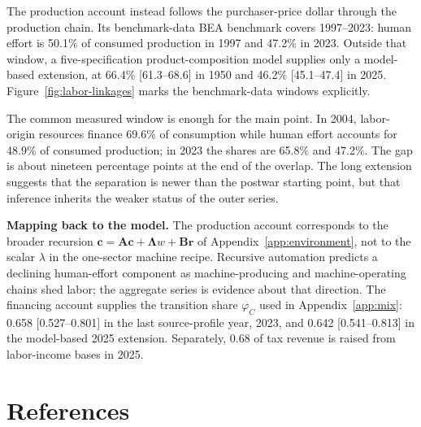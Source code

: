 \documentclass[12pt]{article}
\theoremstyle{plain}
\begin{document}
The production account instead follows the purchaser-price dollar through the production chain. Its benchmark-data BEA benchmark covers 1997--2023: human effort is 50.1\% of consumed production in 1997 and 47.2\% in 2023. Outside that window, a five-specification product-composition model supplies only a model-based extension, at 66.4\% [61.3--68.6] in 1950 and 46.2\% [45.1--47.4] in 2025. Figure~\ref{fig:labor-linkages} marks the benchmark-data windows explicitly.

The common measured window is enough for the main point. In 2004, labor-origin resources finance 69.6\% of consumption while human effort accounts for 48.9\% of consumed production; in 2023 the shares are 65.8\% and 47.2\%. The gap is about nineteen percentage points at the end of the overlap. The long extension suggests that the separation is newer than the postwar starting point, but that inference inherits the weaker status of the outer series.

\textbf{Mapping back to the model.} The production account corresponds to the broader recursion $\mathbf{c}=\mathbf{A}\mathbf{c}+\boldsymbol{\Lambda}w+\mathbf{B}\mathbf{r}$ of Appendix~\ref{app:environment}, not to the scalar $\lambda$ in the one-sector machine recipe. Recursive automation predicts a declining human-effort component as machine-producing and machine-operating chains shed labor; the aggregate series is evidence about that direction. The financing account supplies the transition share $\varphi_C$ used in Appendix~\ref{app:mix}: 0.658 [0.527--0.801] in the last source-profile year, 2023, and 0.642 [0.541--0.813] in the model-based 2025 extension. Separately, 0.68 of tax revenue is raised from labor-income bases in 2025.

\section*{References}
\end{document}
